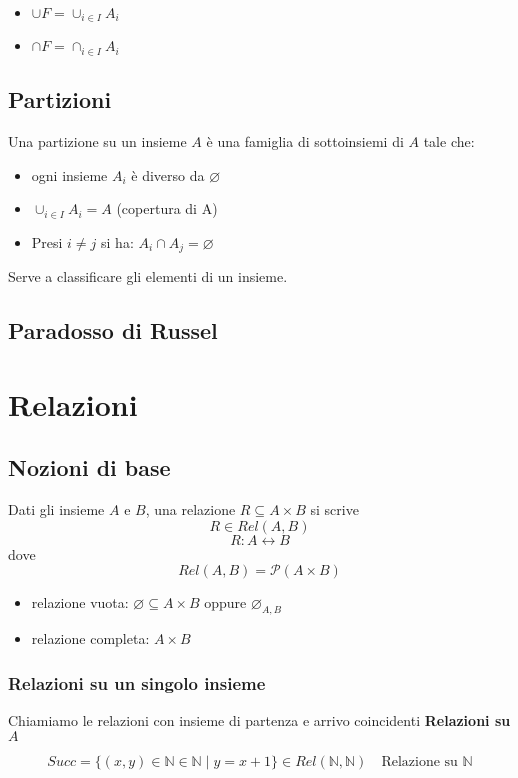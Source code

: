 \documentclass{article}
\begin{document}
\begin{itemize}
    \item \(\cup F = \cup_{i \in I}A_i\)
    \item \(\cap F = \cap_{i \in I}A_i\)
\end{itemize}

\subsection{Partizioni}
Una partizione su un insieme \(A\) è una famiglia di sottoinsiemi di \(A\) tale che:
\begin{itemize}
    \item ogni insieme \(A_i\) è diverso da \(\varnothing\)
    \item \(\cup_{i \in I}A_i = A\) (copertura di A)
    \item Presi \(i \neq j\) si ha: \(A_i \cap A_j = \varnothing\)
\end{itemize}
Serve a classificare  gli elementi di un insieme.

\subsection{Paradosso di Russel}

\pagebreak

\section{Relazioni}
\subsection{Nozioni di base}
Dati gli insieme \(A\) e \(B\), una relazione \(R \subseteq A \times B\) si scrive
\[R \in Rel(A,B)\]
\[R: A \leftrightarrow B\]
dove
\[Rel(A,B) = \mathcal{P}(A \times B)\]

\begin{itemize}
    \item relazione vuota: \(\varnothing \subseteq A \times B\) oppure \(\varnothing_{A,B}\)
    \item relazione completa: \(A \times B\)
\end{itemize}

\subsubsection{Relazioni su un singolo insieme}
Chiamiamo le relazioni con insieme di partenza e arrivo coincidenti \textbf{Relazioni su \(A\)}
\begin{eg}
    \[Succ = \{(x,y) \in \mathbb{N} \in \mathbb{N} \mid y = x + 1\} \in Rel(\mathbb{N}, \mathbb{N}) \quad \text{Relazione su } \mathbb{N}\]
\end{eg}
\end{document}
